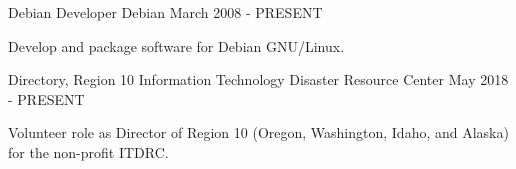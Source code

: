 
\begin{cventries}
  \cventry
    {Debian Developer} %
    {Debian} %
    {}
    {March 2008 - PRESENT} %
    {
      \begin{cvitems} %
        {Develop and package software for Debian GNU/Linux.}
      \end{cvitems}
    }

  \cventry
    {Directory, Region 10} %
    {Information Technology Disaster Resource Center} %
    {}
    {May 2018 - PRESENT} %
    {
      \begin{cvitems} %
        {Volunteer role as Director of Region 10 (Oregon, Washington, Idaho, and Alaska) for the non-profit ITDRC.}
      \end{cvitems}
    }
\end{cventries}
